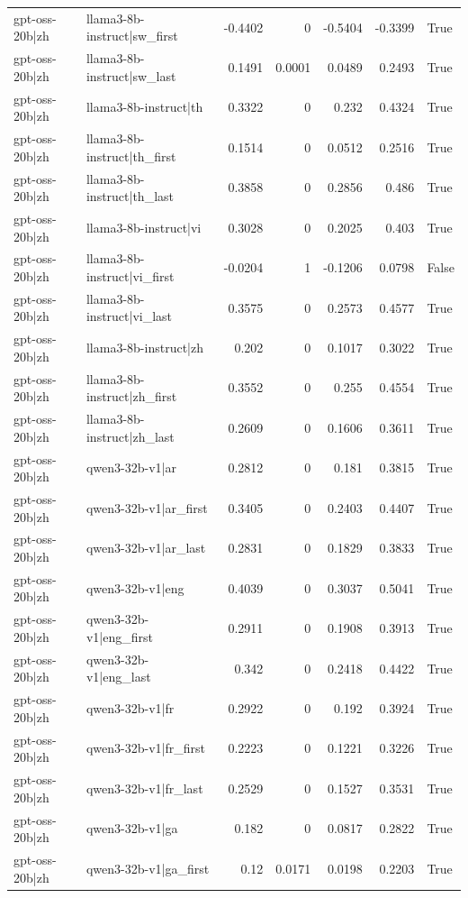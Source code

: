 \begin{table}
\begin{tabular}{l l r r r r l}
gpt-oss-20b|zh & llama3-8b-instruct|sw_first & -0.4402 & 0 & -0.5404 & -0.3399 & True \\
gpt-oss-20b|zh & llama3-8b-instruct|sw_last & 0.1491 & 0.0001 & 0.0489 & 0.2493 & True \\
gpt-oss-20b|zh & llama3-8b-instruct|th & 0.3322 & 0 & 0.232 & 0.4324 & True \\
gpt-oss-20b|zh & llama3-8b-instruct|th_first & 0.1514 & 0 & 0.0512 & 0.2516 & True \\
gpt-oss-20b|zh & llama3-8b-instruct|th_last & 0.3858 & 0 & 0.2856 & 0.486 & True \\
gpt-oss-20b|zh & llama3-8b-instruct|vi & 0.3028 & 0 & 0.2025 & 0.403 & True \\
gpt-oss-20b|zh & llama3-8b-instruct|vi_first & -0.0204 & 1 & -0.1206 & 0.0798 & False \\
gpt-oss-20b|zh & llama3-8b-instruct|vi_last & 0.3575 & 0 & 0.2573 & 0.4577 & True \\
gpt-oss-20b|zh & llama3-8b-instruct|zh & 0.202 & 0 & 0.1017 & 0.3022 & True \\
gpt-oss-20b|zh & llama3-8b-instruct|zh_first & 0.3552 & 0 & 0.255 & 0.4554 & True \\
gpt-oss-20b|zh & llama3-8b-instruct|zh_last & 0.2609 & 0 & 0.1606 & 0.3611 & True \\
gpt-oss-20b|zh & qwen3-32b-v1|ar & 0.2812 & 0 & 0.181 & 0.3815 & True \\
gpt-oss-20b|zh & qwen3-32b-v1|ar_first & 0.3405 & 0 & 0.2403 & 0.4407 & True \\
gpt-oss-20b|zh & qwen3-32b-v1|ar_last & 0.2831 & 0 & 0.1829 & 0.3833 & True \\
gpt-oss-20b|zh & qwen3-32b-v1|eng & 0.4039 & 0 & 0.3037 & 0.5041 & True \\
gpt-oss-20b|zh & qwen3-32b-v1|eng_first & 0.2911 & 0 & 0.1908 & 0.3913 & True \\
gpt-oss-20b|zh & qwen3-32b-v1|eng_last & 0.342 & 0 & 0.2418 & 0.4422 & True \\
gpt-oss-20b|zh & qwen3-32b-v1|fr & 0.2922 & 0 & 0.192 & 0.3924 & True \\
gpt-oss-20b|zh & qwen3-32b-v1|fr_first & 0.2223 & 0 & 0.1221 & 0.3226 & True \\
gpt-oss-20b|zh & qwen3-32b-v1|fr_last & 0.2529 & 0 & 0.1527 & 0.3531 & True \\
gpt-oss-20b|zh & qwen3-32b-v1|ga & 0.182 & 0 & 0.0817 & 0.2822 & True \\
gpt-oss-20b|zh & qwen3-32b-v1|ga_first & 0.12 & 0.0171 & 0.0198 & 0.2203 & True \\

\end{tabular}
\end{table}
